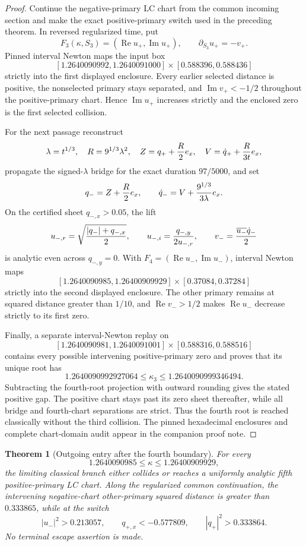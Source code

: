 \documentclass[11pt]{article}
\newtheorem{theorem}{Theorem}
\begin{document}
\begin{proof}
Continue the negative-primary LC chart from the common incoming section and
make the exact positive-primary switch used in the preceding theorem.  In
reversed regularized time, put
\[
 F_3(\kappa,S_3)=(\operatorname{Re}u_+,\operatorname{Im}u_+),
 \qquad \partial_{S_3}u_+=-v_+.
\]
Pinned interval Newton maps the input box
\[
 [1.2640090992,1.2640091000]\times[0.588396,0.588436]
\]
strictly into the first displayed enclosure.  Every earlier selected
distance is positive, the nonselected primary stays separated, and
$\operatorname{Im}v_+<-1/2$ throughout the positive-primary chart.  Hence
$\operatorname{Im}u_+$ increases strictly and the enclosed zero is the first
selected collision.

For the next passage reconstruct
\[
 \lambda=t^{1/3},\quad R=9^{1/3}\lambda^2,\quad
 Z=q_++{R\over2}e_x,\quad V=\dot q_++{R\over3t}e_x,
\]
propagate the signed-$\lambda$ bridge for the exact duration $97/5000$, and
set
\[
 q_-=Z+{R\over2}e_x,
 \qquad \dot q_-=V+{9^{1/3}\over3\lambda}e_x.
\]
On the certified sheet $q_{-,x}>0.05$, the lift
\[
 u_{-,r}=\sqrt{{|q_-|+q_{-,x}\over2}},\qquad
 u_{-,i}={q_{-,y}\over2u_{-,r}},\qquad
 v_-={\overline{u_-}\dot q_-\over2}
\]
is analytic even across $q_{-,y}=0$.  With
$F_4=(\operatorname{Re}u_-,\operatorname{Im}u_-)$, interval Newton maps
\[
 [1.2640090985,1.26400909929]\times[0.37084,0.37284]
\]
strictly into the second displayed enclosure.  The other primary remains at
squared distance greater than $1/10$, and $\operatorname{Re}v_->1/2$ makes
$\operatorname{Re}u_-$ decrease strictly to its first zero.

Finally, a separate interval-Newton replay on
\[
 [1.2640090981,1.2640091001]\times[0.588316,0.588516]
\]
contains every possible intervening positive-primary zero and proves that
its unique root has
\[
 1.2640090992927064\le\kappa_3\le1.2640090999346494.
\]
Subtracting the fourth-root projection with outward rounding gives the
stated positive gap.  The positive chart stays past its zero sheet
thereafter, while all bridge and fourth-chart separations are strict.  Thus
the fourth root is reached classically without the third collision.  The
pinned hexadecimal enclosures and complete chart-domain audit appear in the
companion proof note.
\end{proof}

\begin{theorem}[Outgoing entry after the fourth boundary]
For every
\[
 1.2640090985\le\kappa\le1.26400909929,
\]
the limiting classical branch either collides or reaches a uniformly analytic
fifth positive-primary LC chart.  Along the regularized common continuation,
the intervening negative-chart other-primary squared distance is greater than
$0.333865$, while at the switch
\[
 |u_-|^2>0.213057,\qquad q_{+,x}<-0.577809,
 \qquad |q_+|^2>0.333864.
\]
No terminal escape assertion is made.
\end{theorem}
\end{document}
